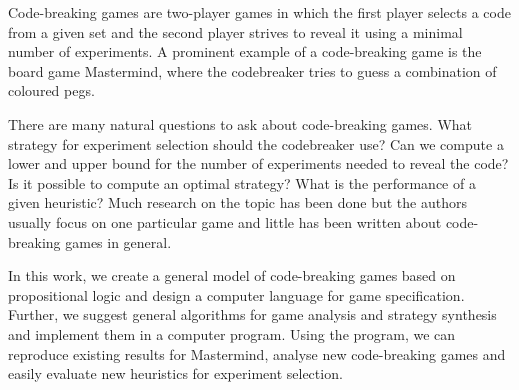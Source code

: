 \begin{ThesisAbstract}
Code-breaking games are two-player games in which the first player selects
  a code from a given set and the second player strives to reveal it using a
  minimal number of experiments.
A prominent example of a code-breaking game is the board game Mastermind,
  where the codebreaker tries to guess a combination of coloured pegs.

There are many natural questions to ask about code-breaking games.
What strategy for experiment selection should the codebreaker use?
Can we compute a lower and upper bound for the number of experiments needed
  to reveal the code?
Is it possible to compute an optimal strategy?
What is the performance of a given heuristic?
Much research on the topic has been done but
  the authors usually focus
  on one particular game and
  little has been written about code-breaking
  games in general.

In this work, we create a general model of code-breaking games
  based on propositional logic
  and design a computer language for game specification.
Further, we suggest general algorithms for game analysis and strategy synthesis
  and implement them in a computer program.
Using the program, we can reproduce existing results for Mastermind,
  analyse new code-breaking games and easily evaluate new heuristics
  for experiment selection.
\end{ThesisAbstract}

\MainMatter
\setlength{\parindent}{0pt}

\setcounter{secnumdepth}{1}
\setcounter{tocdepth}{2}
\begin{spacing}{1.2} \normalsize
\tableofcontents
\end{spacing}










\pagestyle{plain}
\printbibliography[heading=bibintoc]




